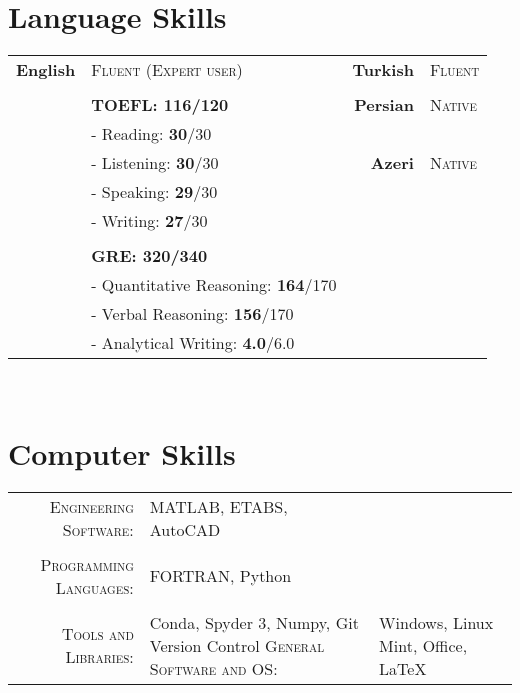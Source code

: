 \documentclass[a4paper,10pt]{article}
\begin{document}
\section{Language Skills}
\begin{tabular}{r|p{6cm} r|p{6cm}}
    \textbf{English} & \textsc{Fluent (Expert user)} & \textbf{Turkish} & \textsc{Fluent}\\
    \\
    & \textbf{TOEFL: 116/120} & \textbf{Persian} & \textsc{Native}\\
    & \footnotesize{- Reading: \textbf{30}/30}\\
    & \footnotesize{- Listening: \textbf{30}/30} & \textbf{Azeri} & \textsc{Native}\\
    & \footnotesize{- Speaking: \textbf{29}/30}\\
    & \footnotesize{- Writing: \textbf{27}/30}\\
    \\
	& \textbf{GRE: 320/340}\\
    & \footnotesize{- Quantitative Reasoning: \textbf{164}/170}\\
 	& \footnotesize{- Verbal Reasoning: \textbf{156}/170}\\
    & \footnotesize{- Analytical Writing:\textbf{ 4.0}/6.0}
\end{tabular}
\\

\section{Computer Skills}
\begin{tabular}{r p{9.5cm}}
    \textsc{Engineering Software:} & MATLAB, ETABS, AutoCAD\\
    \\
    \textsc{Programming Languages:} & FORTRAN, Python\\
    \\
    \textsc{Tools and Libraries:} & Conda, Spyder 3, Numpy, Git Version Control
    \textsc{General Software and OS:} & Windows, Linux Mint, Office, \LaTeX\\
\end{tabular}
\\

\end{document}

